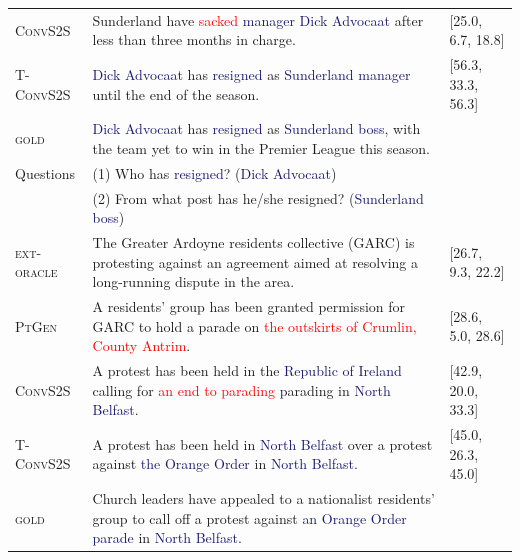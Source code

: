\begin{table}[t!]
{\begin{tabular}{l p{10.5cm} l}
      {\textsc{ConvS2S}} &Sunderland have \textcolor{red}{sacked} \textcolor{midnightblue}{manager} \textcolor{midnightblue}{Dick Advocaat} after less than three months in charge. &[25.0, 6.7, 18.8] \\

      {\textsc{T-ConvS2S}}& \textcolor{midnightblue}{Dick Advocaat} has \textcolor{midnightblue}{resigned} as \textcolor{midnightblue}{Sunderland manager} until the end of the season.& [56.3, 33.3, 56.3] \\
      
      {\textsc{gold}} &\textcolor{midnightblue}{Dick Advocaat} has \textcolor{midnightblue}{resigned} as \textcolor{midnightblue}{Sunderland boss}, with the team yet to win in the Premier League this season. \\
      
      Questions& (1) {Who has \textcolor{midnightblue}{resigned}?}
      (\textcolor{midnightblue}{Dick Advocaat}) \\& (2) {From what post has he/she resigned?} (\textcolor{midnightblue}{Sunderland boss}) \\
            
      \hline
      
      {\textsc{ext-oracle}}& The Greater Ardoyne residents collective (GARC) is protesting against an agreement aimed at resolving a long-running dispute in the area. &[26.7, 9.3, 22.2]  \\

      {\textsc{PtGen}} &A residents' group has been granted permission for GARC to hold a parade on \textcolor{red}{the outskirts of Crumlin, County Antrim}. &[28.6, 5.0, 28.6] \\

      {\textsc{ConvS2S}} &A protest has been held in the \textcolor{midnightblue}{Republic of Ireland} calling for \textcolor{red}{an end to parading} parading in \textcolor{midnightblue}{North Belfast}. &[42.9, 20.0, 33.3] \\

      {\textsc{T-ConvS2S}}& A protest has been held in \textcolor{midnightblue}{North Belfast} over a protest against \textcolor{midnightblue}{the Orange Order} in \textcolor{midnightblue}{North Belfast}.& [45.0, 26.3, 45.0] \\

      {\textsc{gold}} &Church leaders have appealed to a nationalist residents' group to call off a protest against \textcolor{midnightblue}{an Orange Order parade} in \textcolor{midnightblue}{North Belfast}. \\


\end{tabular}}
\end{table}
